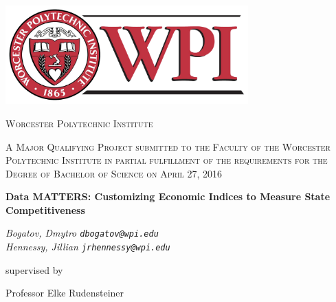 \begin{titlepage}
	\centering
	
	
    \includegraphics[width=0.7\textwidth]{images/wpiLogo.png}\par\vspace{0.0cm}
	
    {\scshape\Large Worcester Polytechnic Institute \par}
	\vspace{0.5cm}
	
    {\scshape\large
		A Major Qualifying Project submitted to the Faculty of the 
		Worcester Polytechnic Institute in partial fulfillment of 
		the requirements for the Degree of Bachelor of Science on April 27, 2016 
	\par}
	\vspace{0.5cm}
	
    {\LARGE\bfseries Data  MATTERS: Customizing Economic Indices to Measure State Competitiveness \par}
	\vspace{1cm}
	
    {\large\itshape 
        Bogatov, Dmytro \texttt{dbogatov@wpi.edu} \\
        Hennessy, Jillian \texttt{jrhennessy@wpi.edu}
     \par}
	\vfill
	
    supervised by\par
	Professor Elke Rudensteiner

	\vfill
    
\end{titlepage}